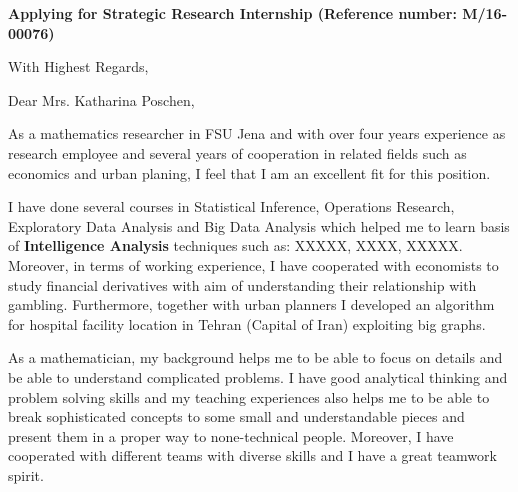 \documentclass[12pt,a4paper,sans]{moderncv}        %
\title{}                               %
\begin{document}
\date{May 17, 2016}
\opening{\textbf{Applying for  Strategic Research Internship (Reference number: M/16-00076)}}
\closing{With Highest Regards,}
\makelettertitle

Dear Mrs. Katharina Poschen,

As a mathematics researcher in FSU Jena and with over four years experience as research employee and several years of cooperation in related fields such as economics and urban planing, I feel that I am an excellent fit for this position.



I have done several courses in Statistical Inference, Operations Research, Exploratory Data Analysis and Big Data Analysis which helped me to learn basis of \textbf{Intelligence Analysis} techniques such as: XXXXX, XXXX, XXXXX. Moreover, in terms of working experience, I have cooperated with economists to study financial derivatives with aim of understanding their relationship with gambling. Furthermore, together with urban planners I developed an algorithm for hospital facility location in Tehran (Capital of Iran) exploiting big graphs.






As a mathematician, my background helps me to be able to focus on details and be able to understand complicated problems. I have good analytical thinking and problem solving skills and my teaching experiences also helps me to be able to break sophisticated concepts to some small and understandable pieces and present them in a proper way to none-technical people. Moreover, I have cooperated with different teams with diverse skills and I have a great teamwork spirit.
\end{document}
